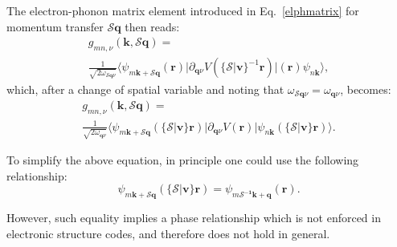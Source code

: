 \documentclass[final,3p,times,twocolumn]{elsarticle}
\begin{document}
The electron-phonon matrix element introduced in Eq.~\eqref{elphmatrix} for  momentum transfer $\mathcal{S}\mathbf{q}$ then reads:
\begin{multline}
	g_{mn,\nu}(\mathbf{k,\mathcal{S}q}) =  \\
	 \frac{1}{\sqrt{2 \omega_{\mathcal{S}\mathbf{q}\nu}} }\big\langle \psi_{m\mathbf{k+\mathcal{S}q}} (\mathbf{r}) \big| \partial_{\mathbf{q}\nu}V (\{\mathcal{S}|\mathbf{v}\}^{-1}\mathbf{r}) \big|  (\mathbf{r}) \psi_{n\mathbf{k}}\big\rangle, 
\end{multline}
which, after a change of spatial variable and noting that $\omega_{\mathcal{S}\mathbf{q}\nu}=\omega_{\mathbf{q}\nu}$, becomes:
\begin{multline}\label{basicGKK}
	g_{mn,\nu}(\mathbf{k,\mathcal{S}q}) = \\
	 \frac{1}{\sqrt{2\omega_{\mathbf{q}\nu}}} \big\langle  \psi_{m\mathbf{k+\mathcal{S}q}} (\{\mathcal{S}|\mathbf{v}\}\mathbf{r}) \big| \partial_{\mathbf{q}\nu}V (\mathbf{r}) \big| \psi_{n\mathbf{k}}(\{\mathcal{S}|\mathbf{v}\}\mathbf{r}) \big\rangle. 
\end{multline}

To simplify the above equation, in principle one could use the following relationship:
\begin{equation}\label{wfrelation}
\psi_{m\mathbf{k+\mathcal{S}q}}(\{\mathcal{S}|\mathbf{v}\}\mathbf{r}) = \psi_{m\mathbf{\mathcal{S}^{-1}k+q}}(\mathbf{r}). 
\end{equation}

However, such equality implies a phase relationship which is not enforced in electronic structure codes, and therefore does not hold in general. 
\end{document}

